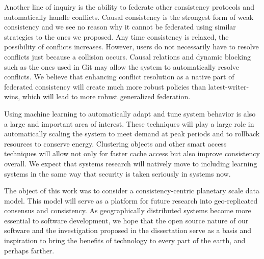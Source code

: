 Another line of inquiry is the ability to federate other consistency protocols and automatically handle conflicts.
Causal consistency is the strongest form of weak consistency and we see no reason why it cannot be federated using similar strategies to the ones we proposed.
Any time consistency is relaxed, the possibility of conflicts increases.
However, users do not necessarily have to resolve conflicts just because a collision occurs.
Causal relations and dynamic blocking such as the ones used in Git may allow the system to automatically resolve conflicts.
We believe that enhancing conflict resolution as a native part of federated consistency will create much more robust policies than latest-writer-wins, which will lead to more robust generalized federation.

Using machine learning to automatically adapt and tune system behavior is also a large and important area of interest.
These techniques will play a large role in automatically scaling the system to meet demand at peak periods and to rollback resources to conserve energy.
Clustering objects and other smart access techniques will allow not only for faster cache access but also improve consistency overall.
We expect that systems research will natively move to including learning systems in the same way that security is taken seriously in systems now.

The object of this work was to consider a consistency-centric planetary scale data model.
This model will serve as a platform for future research into geo-replicated consensus and consistency.
As geographically distributed systems become more essential to software development, we hope that the open source nature of our software and the investigation proposed in the dissertation serve as a basis and inspiration
to bring the benefits of technology to every part of the earth, and perhaps farther.
